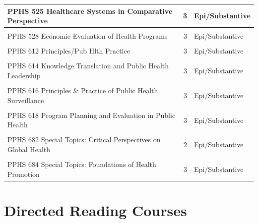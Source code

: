 \documentclass[
  openany]{book}
\begin{document}
\begin{table}
{\begin{tabular}[t]{l|r|l}
\hline
PPHS 525 Healthcare Systems in Comparative Perspective & 3 & Epi/Substantive\\
\hline
\cellcolor{gray!6}{PPHS 527 Economics for Health Services Research and Policy} & \cellcolor{gray!6}{3} & \cellcolor{gray!6}{Epi/Substantive}\\
\hline
PPHS 528 Economic Evaluation of Health Programs & 3 & Epi/Substantive\\
\hline
\cellcolor{gray!6}{PPHS 529 Global Environmental Health and Burden of Disease} & \cellcolor{gray!6}{3} & \cellcolor{gray!6}{Epi/Substantive}\\
\hline
PPHS 612 Principles/Pub Hlth Practice & 3 & Epi/Substantive\\
\hline
\cellcolor{gray!6}{PPHS 613 The Practice of Global Health} & \cellcolor{gray!6}{3} & \cellcolor{gray!6}{Epi/Substantive}\\
\hline
PPHS 614 Knowledge Translation and Public Health Leadership & 3 & Epi/Substantive\\
\hline
\cellcolor{gray!6}{PPHS 615 Intro:Infectious Disease Epid} & \cellcolor{gray!6}{3} & \cellcolor{gray!6}{Epi/Substantive}\\
\hline
PPHS 616 Principles \& Practice of Public Health Surveillance & 3 & Epi/Substantive\\
\hline
\cellcolor{gray!6}{PPHS 617 Impact Evaluation} & \cellcolor{gray!6}{3} & \cellcolor{gray!6}{Epi/Substantive}\\
\hline
PPHS 618 Program Planning and Evaluation in Public Health & 3 & Epi/Substantive\\
\hline
\cellcolor{gray!6}{PPHS 624 Public Health Ethics \& Policy} & \cellcolor{gray!6}{3} & \cellcolor{gray!6}{Epi/Substantive}\\
\hline
PPHS 682 Special Topics: Critical Perspectives on Global Health & 2 & Epi/Substantive\\
\hline
\cellcolor{gray!6}{PPHS 683 Special Topics: Vaccine Epidemiology} & \cellcolor{gray!6}{3} & \cellcolor{gray!6}{Epi/Substantive}\\
\hline
PPHS 684 Special Topics: Foundations of Health Promotion & 3 & Epi/Substantive\\
\hline
\end{tabular}}
\end{table}

\hypertarget{directed-reading-courses}{%
\section{Directed Reading Courses}\label{directed-reading-courses}}
\end{document}
